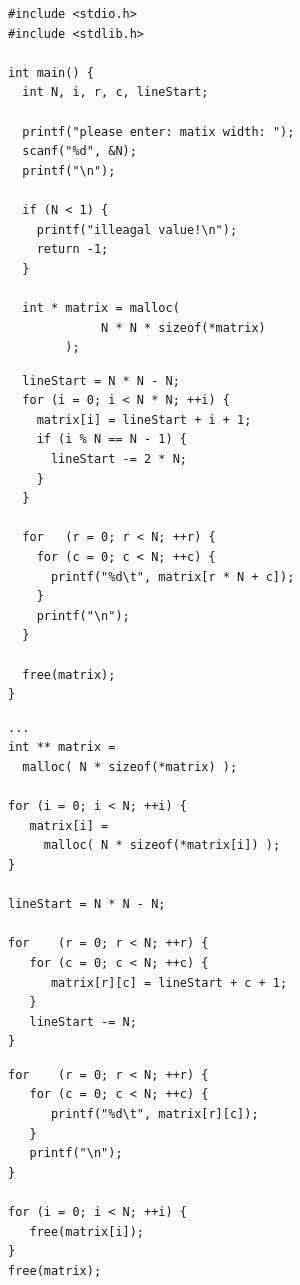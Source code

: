\begin{frame}[fragile]
%
%
\begin{codebox}
\begin{verbatim}
#include <stdio.h>
#include <stdlib.h>

int main() {
  int N, i, r, c, lineStart;
	
  printf("please enter: matix width: ");
  scanf("%d", &N);
  printf("\n");
	
  if (N < 1) {
    printf("illeagal value!\n");
    return -1;
  }
	
  int * matrix = malloc(
             N * N * sizeof(*matrix)
        );
\end{verbatim}
\end{codebox}
%
\begin{codebox}[...Fortsetzung]
\begin{verbatim}
  lineStart = N * N - N;
  for (i = 0; i < N * N; ++i) {
    matrix[i] = lineStart + i + 1;
    if (i % N == N - 1) {
      lineStart -= 2 * N;
    }
  }
	
  for   (r = 0; r < N; ++r) {
    for (c = 0; c < N; ++c) {
      printf("%d\t", matrix[r * N + c]);
    }
    printf("\n");
  }

  free(matrix);
}
\end{verbatim}
\end{codebox}
%
\end{frame}


\begin{frame}[fragile]
%
%
\begin{codebox}[Beispiel: 2D-Matrix-Repräsentation, equal height group = xmp2DMatrix]
\begin{verbatim}
...
int ** matrix =
  malloc( N * sizeof(*matrix) );

for (i = 0; i < N; ++i) {
   matrix[i] =
     malloc( N * sizeof(*matrix[i]) );
}

lineStart = N * N - N;

for    (r = 0; r < N; ++r) {
   for (c = 0; c < N; ++c) {
      matrix[r][c] = lineStart + c + 1;
   }
   lineStart -= N;
}
\end{verbatim}
\end{codebox}
%
\begin{codebox}[...Fortsetzung, equal height group = xmp2DMatrix]
\begin{verbatim}
for    (r = 0; r < N; ++r) {
   for (c = 0; c < N; ++c) {
      printf("%d\t", matrix[r][c]);
   }
   printf("\n");
}

for (i = 0; i < N; ++i) {
   free(matrix[i]);
}
free(matrix);
\end{verbatim}
\end{codebox}
%
\end{frame}

